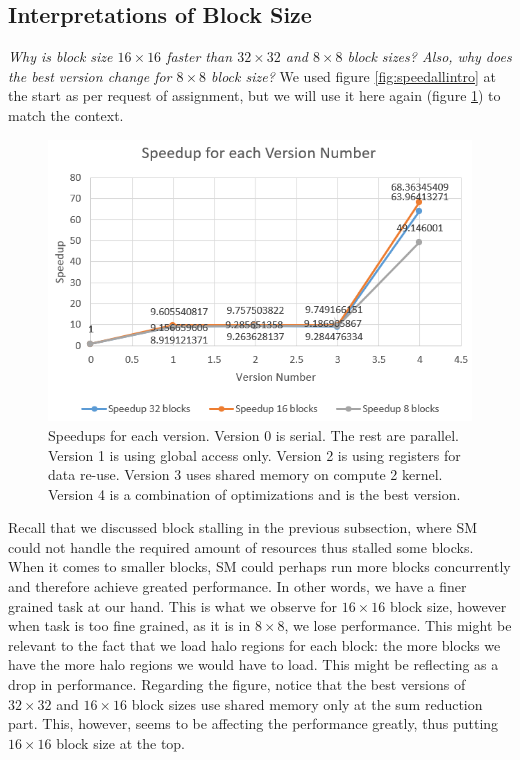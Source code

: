 \documentclass[12pt,reqno]{amsart}
\begin{document}
\subsection{Interpretations of Block Size}
\textit{Why is block size $16\times16$ faster than $32\times32$ and $8\times8$ block sizes? Also, why does the best version change for $8\times8$ block size?} We used figure \ref{fig:speedallintro} at the start as per request of assignment, but we will use it here again (figure \ref{fig:speedallintro2}) to match the context.
\begin{figure}[h]
\centering
\includegraphics[width=0.92\linewidth]{speedall.png}
\caption{Speedups for each version. Version 0 is serial. The rest are parallel. Version 1 is using global access only. Version 2 is using registers for data re-use. Version 3 uses shared memory on compute 2 kernel. Version 4 is a combination of optimizations and is the best version.}
\label{fig:speedallintro2}
\end{figure}
Recall that we discussed block stalling in the previous subsection, where SM could not handle the required amount of resources thus stalled some blocks. When it comes to smaller blocks, SM could perhaps run more blocks concurrently and therefore achieve greated performance. In other words, we have a finer grained task at our hand. This is what we observe for $16\times16$ block size, however when task is too fine grained, as it is in $8\times8$, we lose performance. This might be relevant to the fact that we load halo regions for each block: the more blocks we have the more halo regions we would have to load. This might be reflecting as a drop in performance.
Regarding the figure, notice that the best versions of $32\times32$ and $16\times16$ block sizes use shared memory only at the sum reduction part. This, however, seems to be affecting the performance greatly, thus putting $16\times16$ block size at the top.
\end{document}
